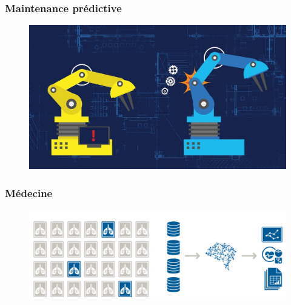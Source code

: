 \documentclass[compress]{beamer}
\begin{document}
\begin{frame}
	\frametitle{Maintenance prédictive}

	\begin{figure}
		\centering
		\includegraphics[width=1\linewidth]{resources/maintenance}

	\end{figure}

\end{frame}

\begin{frame}
	\frametitle{Médecine}

	\begin{figure}
		\centering
		\includegraphics[width=1\linewidth]{resources/medical}
	\end{figure}

\end{frame}
\end{document}
